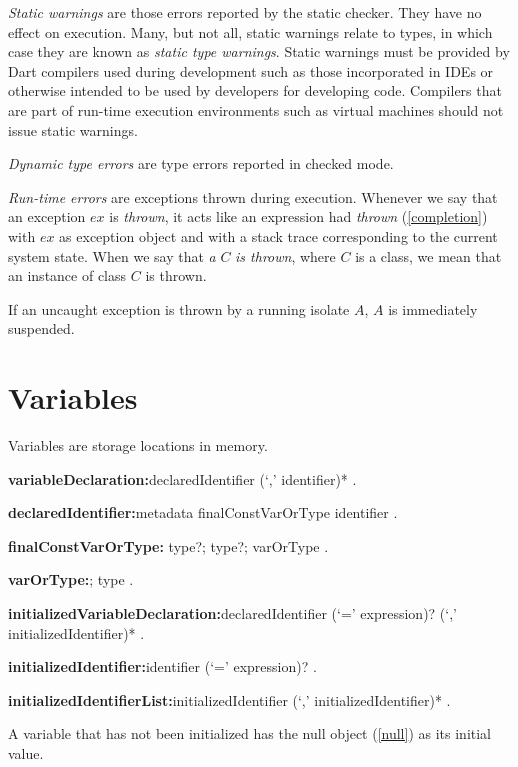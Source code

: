 \documentclass{article}
\begin{document}
\LMHash{}
{\em Static warnings} are those errors reported by the static checker.
They have no effect on execution.
Many, but not all, static warnings relate to types, in which case they are known as {\em static type warnings}.
Static warnings must be provided by Dart compilers used during development such as those incorporated in IDEs or otherwise intended to be used by developers for developing code.
Compilers that are part of run-time execution environments such as virtual machines should not issue static warnings.

\LMHash{}
{\em Dynamic type errors} are type errors reported in checked mode.

\LMHash{}
{\em Run-time errors} are exceptions thrown during execution.
Whenever we say that an exception $ex$ is {\em thrown}, it acts like an expression had {\em thrown} (\ref{completion}) with $ex$ as exception object and with a stack trace corresponding to the current system state.
When we say that {\em a} $C$ {\em is thrown}, where $C$ is a class, we mean that an instance of class $C$ is thrown.

\LMHash{}
If an uncaught exception is thrown by a running isolate $A$, $A$ is immediately suspended.


\section{Variables}

\LMHash{}
Variables are storage locations in memory.

\begin{grammar}
{\bf variableDeclaration:}declaredIdentifier (`,' identifier)*
  .

{\bf declaredIdentifier:}metadata finalConstVarOrType identifier
  .

{\bf finalConstVarOrType:}\FINAL{} type?;
  \CONST{} type?;
  varOrType
  .

{\bf varOrType:}\VAR{};
  type
  .

{\bf initializedVariableDeclaration:}declaredIdentifier (`=' expression)? (`,' initializedIdentifier)*
  .

{\bf initializedIdentifier:}identifier (`=' expression)?
  .

{\bf initializedIdentifierList:}initializedIdentifier (`,' initializedIdentifier)*
  .
\end{grammar}

\LMHash{}
A variable that has not been initialized has the null object (\ref{null}) as its initial value.
\end{document}
